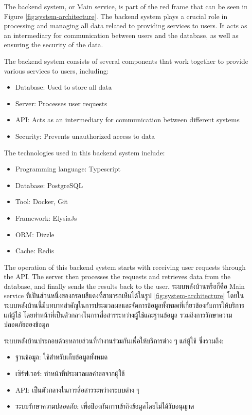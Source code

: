 \ifenglish
The backend system, or Main service, is part of the red frame that can be seen in Figure \ref{fig:system-architecture}. The backend system plays a crucial role in processing and managing all data related to providing services to users. It acts as an intermediary for communication between users and the database, as well as ensuring the security of the data.

The backend system consists of several components that work together to provide various services to users, including:
\begin{itemize}
    \item Database: Used to store all data
    \item Server: Processes user requests
    \item API: Acts as an intermediary for communication between different systems
    \item Security: Prevents unauthorized access to data
\end{itemize}

The technologies used in this backend system include:
\begin{itemize}
    \item Programming language: Typescript \cite{typescript}
    \item Database: PostgreSQL \cite{postgresql}
    \item Tool: Docker, Git \cite{git}
    \item Framework: ElysiaJs \cite{elysiaJs}
    \item ORM: Dizzle \cite{dizzleORM}
    \item Cache: Redis \cite{redis}
\end{itemize}

The operation of this backend system starts with receiving user requests through the API. The server then processes the requests and retrieves data from the database, and finally sends the results back to the user.
\else 
ระบบหลังบ้านหรือก็คือ Main service ที่เป็นส่วนหนึ่งของกรอบสีแดงที่สามารถเห็นได้ในรูป \ref{fig:system-architecture} โดยในระบบหลังบ้านนี้มีบทบาทสำคัญในการประมวลผลและจัดการข้อมูลทั้งหมดที่เกี่ยวข้องกับการให้บริการแก่ผู้ใช้ โดยทำหน้าที่เป็นตัวกลางในการสื่อสารระหว่างผู้ใช้และฐานข้อมูล รวมถึงการรักษาความปลอดภัยของข้อมูล

ระบบหลังบ้านประกอบด้วยหลายส่วนที่ทำงานร่วมกันเพื่อให้บริการต่าง ๆ แก่ผู้ใช้ ซึ่งรวมถึง:
\begin{itemize}
    \item ฐานข้อมูล: ใช้สำหรับเก็บข้อมูลทั้งหมด
    \item เซิร์ฟเวอร์: ทำหน้าที่ประมวลผลคำขอจากผู้ใช้
    \item API: เป็นตัวกลางในการสื่อสารระหว่างระบบต่าง ๆ
    \item ระบบรักษาความปลอดภัย: เพื่อป้องกันการเข้าถึงข้อมูลโดยไม่ได้รับอนุญาต
\end{itemize}

